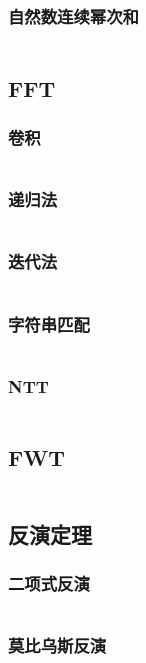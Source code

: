 \documentclass[a4paper,11pt]{article}
\begin{document}
\subsubsection{自然数连续幂次和}
\inputminted[breaklines]{c++}{数论/自然数连续幂次和.cpp}

\subsection{FFT} 
\subsubsection{卷积} 
\inputminted[breaklines]{c++}{数论/fft卷积.cpp} 
\subsubsection{递归法} 
\inputminted[breaklines]{c++}{数论/fft递归法.cpp} 
\subsubsection{迭代法} 
\inputminted[breaklines]{c++}{数论/fft迭代法.cpp} 
\subsubsection{字符串匹配} 
\inputminted[breaklines]{c++}{数论/fft字符串匹配.cpp} 
\subsubsection{NTT} 
\inputminted[breaklines]{c++}{数论/NTT.cpp} 
\subsection{FWT}
\inputminted[breaklines]{c++}{数论/FWT.cpp}

\subsection{反演定理} 
\subsubsection{二项式反演} 
\inputminted[breaklines]{c++}{数论/二项式反演.cpp}
\subsubsection{莫比乌斯反演} 
\inputminted[breaklines]{c++}{数论/莫比乌斯反演.cpp}
\end{document}
